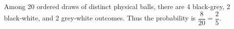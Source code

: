 Among 20 ordered draws of distinct physical balls, there are 4 black-grey, 2 black-white, and 2 grey-white outcomes. Thus the probability is $\dfrac{8}{20}=\boxed{\dfrac{2}{5}}$.
